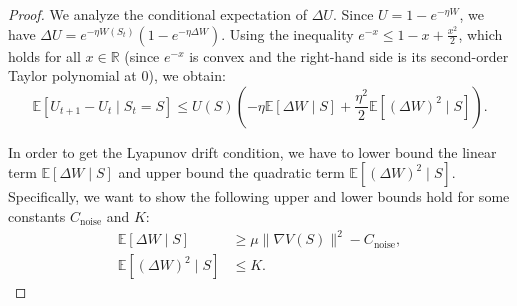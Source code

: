 \documentclass[12pt]{article}
\begin{document}
\begin{proof}
We analyze the conditional expectation of $\Delta U$. Since $U = 1 - e^{-\eta W}$, we have $\Delta U = e^{-\eta W(S_t)}(1 - e^{-\eta \Delta W})$. Using the inequality $e^{-x} \le 1 - x + \frac{x^2}{2}$, which holds for all $x \in \mathbb{R}$ (since $e^{-x}$ is convex and the right-hand side is its second-order Taylor polynomial at $0$), we obtain:
\begin{equation}
    \mathbb{E}[U_{t+1} - U_t \mid S_t=S] \le U(S) \left( -\eta \mathbb{E}[\Delta W \mid S] + \frac{\eta^2}{2} \mathbb{E}[(\Delta W)^2 \mid S] \right).
\end{equation}

In order to get the Lyapunov drift condition, we have to lower bound the linear term $\mathbb{E}[\Delta W \mid S]$ and upper bound the quadratic term $\mathbb{E}[(\Delta W)^2 \mid S]$. Specifically, we want to show the following upper and lower bounds hold for some constants $C_{\text{noise}}$ and $K$:
\begin{align}
\mathbb{E}[\Delta W \mid S] &\ge \mu \|\nabla V(S)\|^2 - C_{\text{noise}}, \\
\mathbb{E}[(\Delta W)^2 \mid S] &\le K.
\end{align}


\end{proof}
\end{document}
